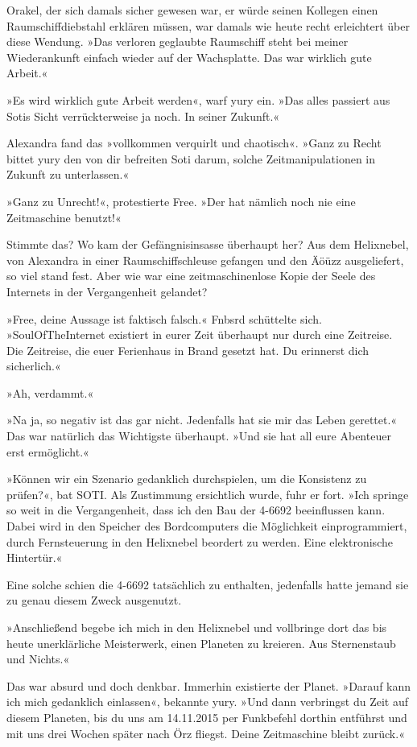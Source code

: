 Orakel, der sich damals sicher gewesen war, er würde seinen Kollegen einen Raumschiffdiebstahl erklären müssen, war damals wie heute recht erleichtert über diese Wendung. »Das verloren geglaubte Raumschiff steht bei meiner Wiederankunft einfach wieder auf der Wachsplatte. Das war wirklich gute Arbeit.«

»Es wird wirklich gute Arbeit werden«, warf yury ein. »Das alles passiert aus Sotis Sicht verrückterweise ja noch. In seiner Zukunft.«

Alexandra fand das »vollkommen verquirlt und chaotisch«. »Ganz zu Recht bittet yury den von dir befreiten Soti darum, solche Zeitmanipulationen in Zukunft zu unterlassen.«

»Ganz zu Unrecht!«, protestierte Free. »Der hat nämlich noch nie eine Zeitmaschine benutzt!«

Stimmte das? Wo kam der Gefängnisinsasse überhaupt her? Aus dem Helixnebel, von Alexandra in einer Raumschiffschleuse gefangen und den Äöüzz ausgeliefert, so viel stand fest. Aber wie war eine zeitmaschinenlose Kopie der Seele des Internets in der Vergangenheit gelandet?

»Free, deine Aussage ist faktisch falsch.« Fnbsrd schüttelte sich. »SoulOfTheInternet existiert in eurer Zeit überhaupt nur durch eine Zeitreise. Die Zeitreise, die euer Ferienhaus in Brand gesetzt hat. Du erinnerst dich sicherlich.«

»Ah, verdammt.«

»Na ja, so negativ ist das gar nicht. Jedenfalls hat sie mir das Leben gerettet.« Das war natürlich das Wichtigste überhaupt. »Und sie hat all eure Abenteuer erst ermöglicht.«

»Können wir ein Szenario gedanklich durchspielen, um die Konsistenz zu prüfen?«, bat SOTI. Als Zustimmung ersichtlich wurde, fuhr er fort. »Ich springe so weit in die Vergangenheit, dass ich den Bau der 4-6692 beeinflussen kann. Dabei wird in den Speicher des Bordcomputers die Möglichkeit einprogrammiert, durch Fernsteuerung in den Helixnebel beordert zu werden. Eine elektronische Hintertür.«

Eine solche schien die 4-6692 tatsächlich zu enthalten, jedenfalls hatte jemand sie zu genau diesem Zweck ausgenutzt.

»Anschließend begebe ich mich in den Helixnebel und vollbringe dort das bis heute unerklärliche Meisterwerk, einen Planeten zu kreieren. Aus Sternenstaub und Nichts.«

Das war absurd und doch denkbar. Immerhin existierte der Planet. »Darauf kann ich mich gedanklich einlassen«, bekannte yury. »Und dann verbringst du Zeit auf diesem Planeten, bis du uns am 14.11.2015 per Funkbefehl dorthin entführst und mit uns drei Wochen später nach Örz fliegst. Deine Zeitmaschine bleibt zurück.«

